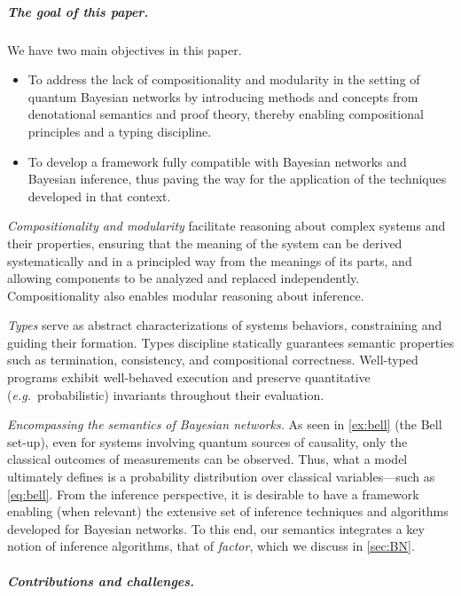 \documentclass[10pt,a4paper]{article}
\newcommand*{\eg}{\emph{e.g.}\xspace}
\begin{document}
\subparagraph{The goal of this paper.}

We have two main objectives in this paper.
\begin{itemize}
\item
To address the lack of compositionality and modularity in the setting of quantum Bayesian networks by introducing methods and concepts from denotational semantics and proof theory, thereby enabling compositional principles and a typing discipline.
\item
To develop a framework fully compatible with Bayesian networks and Bayesian inference, thus paving the way for the application of the techniques developed in that context.
\end{itemize}

\emph{Compositionality and modularity} facilitate reasoning about complex systems and their properties, ensuring that the meaning of the system can be derived systematically and in a principled way from the meanings of its parts, and allowing components to be analyzed and replaced independently.
Compositionality also enables modular reasoning about inference.

\emph{Types} serve as abstract characterizations of systems behaviors, constraining and guiding their formation.
Types discipline statically guarantees semantic properties such as termination, consistency, and compositional correctness.
Well-typed programs exhibit well-behaved execution and preserve quantitative (\eg\ probabilistic) invariants throughout their evaluation.

\emph{Encompassing the semantics of Bayesian networks.}
As seen in \cref{ex:bell} (the Bell set-up), even for systems involving quantum sources of causality, only the classical outcomes of measurements can be observed.
Thus, what a model ultimately defines is a probability distribution over classical variables---such as \cref{eq:bell}.
From the inference perspective, it is desirable to have a framework enabling (when relevant) the extensive set of inference techniques and algorithms developed for Bayesian networks.
To this end, our semantics integrates a key notion of inference algorithms, that of \emph{factor}, which we discuss in \cref{sec:BN}.

\subparagraph{Contributions and challenges.}
\end{document}
